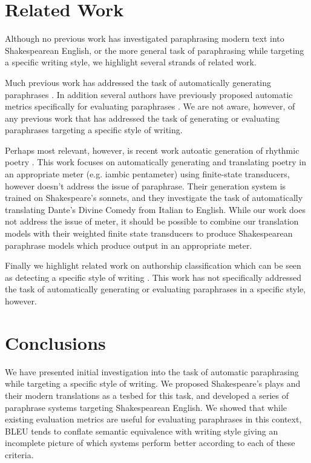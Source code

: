 \documentclass[10pt,a5paper,twoside]{article}
\begin{document}
\section{Related Work}
Although no previous work has investigated paraphrasing modern text into Shakespearean English, or the more general task of paraphrasing while targeting a specific writing
style, we highlight several strands of related work.

Much previous work has addressed the task of automatically generating paraphrases \cite{Barzilay03,dolan04,Shinyama03,Das09,bannard05,Callison-Burch08,Kok10}.  
In addition several authors have previously proposed 
automatic metrics specifically for evaluating paraphrases \cite{chen11,Callison-Burch08b,liu10}.
We are not aware, however, of any previous work that has addressed the task of generating or evaluating
paraphrases targeting a specific style of writing.

Perhaps most relevant, however, is recent work autoatic generation of rhythmic poetry \cite{Greene10}.  This work focuses on automatically generating and translating
poetry in an appropriate meter (e.g. iambic pentameter) using finite-state transducers, however doesn't address the issue of paraphrase.  Their generation system
is trained on Shakespeare's sonnets, and they investigate the task of automatically translating Dante's Divine Comedy from Italian to English.
While our work does not address the issue of meter, it should be possible to combine our translation
models with their weighted finite state transducers to produce Shakespearean paraphrase models which produce output in an appropriate meter.

Finally we highlight related work on authorship classification which can be seen as detecting a specific style of writing \cite{Gamon04,Raghavan10}.
This work has not specifically addressed the task of automatically generating or evaluating paraphrases in a specific style, however.

\section{Conclusions}
We have presented initial investigation into the task of automatic paraphrasing while targeting a specific style of writing.  We proposed Shakespeare's plays and their
modern translations as a tesbed for this task, and developed a series of paraphrase systems targeting Shakespearean English.  We showed that while existing evaluation
metrics are useful for evaluating paraphrases in this context, BLEU tends to conflate semantic equivalence with writing style giving an incomplete picture of which systems
perform better according to each of these criteria.  
\end{document}
